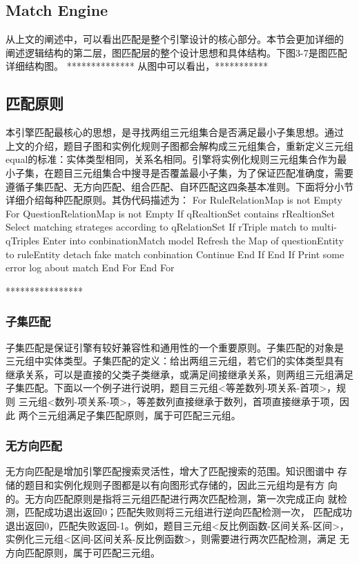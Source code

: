 \documentclass{standalone}
\begin{document}
\subsection{Match Engine}
从上文的阐述中，可以看出匹配是整个引擎设计的核心部分。本节会更加详细的
阐述逻辑结构的第二层，图匹配层的整个设计思想和具体结构。下图3-7是图匹配
详细结构图。
**************
从图中可以看出，***********

\subsection{匹配原则}
本引擎匹配最核心的思想，是寻找两组三元组集合是否满足最小子集思想。通过
上文的介绍，题目子图和实例化规则子图都会解构成三元组集合，重新定义三元组
equal的标准：实体类型相同，关系名相同。引擎将实例化规则三元组集合作为最
小子集，在题目三元组集合中搜寻是否覆盖最小子集，为了保证匹配准确度，需要
遵循子集匹配、无方向匹配、组合匹配、自环匹配这四条基本准则。下面将分小节
详细介绍每种匹配原则。其伪代码描述为：
For RuleRelationMap is not Empty
	For QuestionRelationMap is not Empty
		If qRealtionSet contains rRealtionSet
			Select matching strateges according to qRelationSet 
				If rTriple match to multi-qTriples
					Enter into conbinationMatch model
						Refresh the Map of questionEntity to ruleEntity 
						detach fake match conbination
				Continue
				End If
		End If
		Print some error log about match
	End For
End For

****************
\subsubsection{子集匹配}
子集匹配是保证引擎有较好兼容性和通用性的一个重要原则。子集匹配的对象是
三元组中实体类型。子集匹配的定义：给出两组三元组，若它们的实体类型具有
继承关系，可以是直接的父类子类继承，或满足间接继承关系，则两组三元组满足
子集匹配。下面以一个例子进行说明，题目三元组<等差数列-项关系-首项>，规则
三元组<数列-项关系-项>，等差数列直接继承于数列，首项直接继承于项，因此
两个三元组满足子集匹配原则，属于可匹配三元组。
\subsubsection{无方向匹配}
无方向匹配是增加引擎匹配搜索灵活性，增大了匹配搜索的范围。知识图谱中
存储的题目和实例化规则子图都是以有向图形式存储的，因此三元组均是有方
向的。无方向匹配原则是指将三元组匹配进行两次匹配检测，第一次完成正向
就检测，匹配成功退出返回0；匹配失败则将三元组进行逆向匹配检测一次，
匹配成功退出返回0，匹配失败返回-1。例如，题目三元组<反比例函数-区间关系-区间>，
实例化三元组<区间-区间关系-反比例函数>，则需要进行两次匹配检测，满足
无方向匹配原则，属于可匹配三元组。
\end{document}
